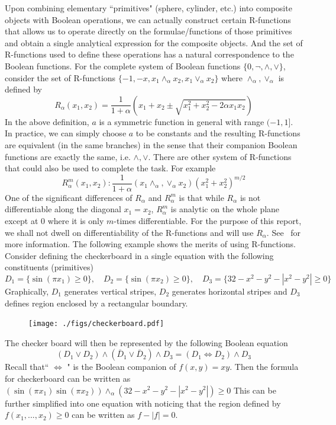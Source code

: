 \documentclass[11pt]{amsart}
\theoremstyle{definition}
\begin{document}
Upon combining elementary ``primitives" (sphere, cylinder, etc.) into composite objects with Boolean operations, we can actually construct certain R-functions that allows us to operate directly on the formulae/functions of those primitives and obtain a single analytical expression for the composite objects. And the set of R-functions used to define these operations has a natural correspondence to the Boolean functions. For the complete system of Boolean functions $\{0, \neg, \wedge, \vee\}$, consider the set of R-functions $\{-1,-x, x_1\wedge_\alpha x_2, x_1\vee_\alpha x_2\}$ where $\wedge_\alpha, \vee_\alpha$ is defined by
$$R_\alpha(x_1,x_2)=\frac{1}{1+\alpha} (x_1+x_2\pm \sqrt{x_1^2+x_2^2-2\alpha x_1x_2})$$
In the above definition, $a$ is a symmetric function in general with range $(-1,1]$. In practice, we can simply choose $a$ to be constants and the resulting R-functions are equivalent (in the same branches) in the sense that their companion Boolean functions are exactly the same, i.e. $\wedge,\vee$. There are other system of R-functions that could also be used to complete the task. For example
$$R_{\alpha}^m(x_1,x_2): \frac{1}{1+\alpha} (x_1 \wedge_\alpha ,\vee_\alpha x_2)(x_1^2+x_2^2)^{m/2}$$
One of the significant differences of $R_\alpha$ and $R_{\alpha}^{m}$ is that while $R_\alpha$ is not differentiable along the diagonal $x_1=x_2$, $R_{\alpha}^m$ is analytic on the whole plane except at $0$ where it is only $m$-times differentiable. For the purpose of this report, we shall not dwell on differentiability of the R-functions and will use $R_\alpha$. See~\cite{Shapiro} for more information.
The following example shows the merits of using R-functions. Consider defining the checkerboard in a single equation with the following constituents (primitives) 
$$D_1=\{\sin(\pi x_1)\geq 0\}, \quad D_2=\{\sin(\pi x_2)\geq 0\},\quad D_3=\{32-x^2-y^2-|x^2-y^2|\geq 0\}$$ 
Graphically, $D_1$ generates vertical stripes, $D_2$ generates horizontal stripes and $D_3$ defines region enclosed by a rectangular boundary. 
\begin{figure}[H]
\texttt{[image: ./figs/checkerboard.pdf]}
\end{figure}

The checker board will then be represented by the following Boolean equation
$$(D_1\vee D_2)\wedge (\bar{D}_1\vee \bar{D}_2)\wedge D_3=(D_1\Leftrightarrow D_2)\wedge D_3$$
Recall that`` $\Leftrightarrow$ " is the Boolean companion of $f(x,y)=xy$. Then the formula for checkerboard can be written as 
$(\sin(\pi x_1)\sin(\pi x_2)) \wedge_\alpha (32-x^2-y^2-|x^2-y^2|) \geq 0$
This can be further simplified into one equation with noticing that the region defined by $f(x_1,...,x_2)\geq 0$ can be written as $f-|f|= 0$.  
\end{document}
